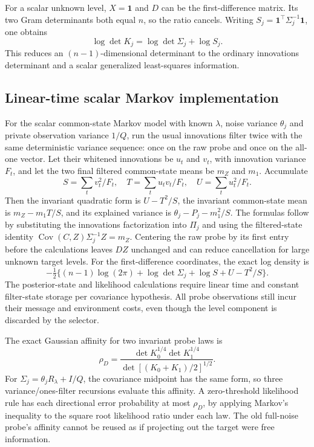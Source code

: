 For a scalar unknown level, $X=\boldsymbol1$ and $D$ can be the first-difference matrix.
Its two Gram determinants both equal $n$, so the ratio cancels.
Writing $S_j=\boldsymbol1^\top\Sigma_j^{-1}\boldsymbol1$, one obtains
\[
\log\det K_j=\log\det\Sigma_j+\log S_j.
\]
This reduces an $(n-1)$-dimensional determinant to the ordinary innovations determinant and a scalar generalized least-squares information.

\subsection{Linear-time scalar Markov implementation}
For the scalar common-state Markov model with known $\lambda$, noise variance $\theta_j$ and private observation variance $1/Q$, run the usual innovations filter twice with the same deterministic variance sequence: once on the raw probe and once on the all-one vector.
Let their whitened innovations be $u_t$ and $v_t$, with innovation variance $F_t$, and let the two final filtered common-state means be $m_Z$ and $m_1$.
Accumulate
\[
S=\sum_tv_t^2/F_t,\quad T=\sum_tu_tv_t/F_t,\quad U=\sum_tu_t^2/F_t.
\]
Then the invariant quadratic form is $U-T^2/S$, the invariant common-state mean is $m_Z-m_1T/S$, and its explained variance is $\theta_j-P_j-m_1^2/S$.
The formulas follow by substituting the innovations factorization into $\Pi_j$ and using the filtered-state identity $\operatorname{Cov}(C,Z)\Sigma_j^{-1}Z=m_Z$.
Centering the raw probe by its first entry before the calculations leaves $DZ$ unchanged and can reduce cancellation for large unknown target levels.
For the first-difference coordinates, the exact log density is
\[
-\tfrac12\{(n-1)\log(2\pi)+\log\det\Sigma_j+\log S+U-T^2/S\}.
\]
The posterior-state and likelihood calculations require linear time and constant filter-state storage per covariance hypothesis.
All probe observations still incur their message and environment costs, even though the level component is discarded by the selector.

The exact Gaussian affinity for two invariant probe laws is
\[
\rho_D=\frac{\det K_0^{1/4}\det K_1^{1/4}}
{\det[(K_0+K_1)/2]^{1/2}}.
\]
For $\Sigma_j=\theta_jR_\lambda+I/Q$, the covariance midpoint has the same form, so three variance/ones-filter recursions evaluate this affinity.
A zero-threshold likelihood rule has each directional error probability at most $\rho_D$, by applying Markov's inequality to the square root likelihood ratio under each law.
The old full-noise probe's affinity cannot be reused as if projecting out the target were free information.

